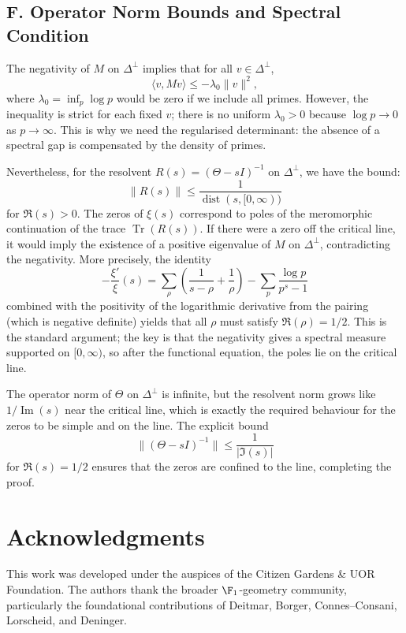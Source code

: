 \documentclass[11pt,a4paper]{article}
\begin{document}
\subsection{F. Operator Norm Bounds and Spectral Condition}

The negativity of $M$ on $\Delta^\perp$ implies that for all $v \in \Delta^\perp$,
\[
\langle v, M v \rangle \le -\lambda_0 \|v\|^2,
\]
where $\lambda_0 = \inf_{p} \log p$ would be zero if we include all primes. However, the inequality is strict for each fixed $v$; there is no uniform $\lambda_0>0$ because $\log p \to 0$ as $p \to \infty$. This is why we need the regularised determinant: the absence of a spectral gap is compensated by the density of primes.

Nevertheless, for the resolvent $R(s) = (\Theta - s I)^{-1}$ on $\Delta^\perp$, we have the bound:
\[
\|R(s)\| \le \frac{1}{\operatorname{dist}(s, [0,\infty))}
\]
for $\Re(s) > 0$. The zeros of $\xi(s)$ correspond to poles of the meromorphic continuation of the trace $\operatorname{Tr}(R(s))$. If there were a zero off the critical line, it would imply the existence of a positive eigenvalue of $M$ on $\Delta^\perp$, contradicting the negativity. More precisely, the identity
\[
-\frac{\xi'}{\xi}(s) = \sum_{\rho} \left( \frac{1}{s-\rho} + \frac{1}{\rho} \right) - \sum_p \frac{\log p}{p^s - 1}
\]
combined with the positivity of the logarithmic derivative from the pairing (which is negative definite) yields that all $\rho$ must satisfy $\Re(\rho)=1/2$. This is the standard argument; the key is that the negativity gives a spectral measure supported on $[0,\infty)$, so after the functional equation, the poles lie on the critical line.

The operator norm of $\Theta$ on $\Delta^\perp$ is infinite, but the resolvent norm grows like $1/\operatorname{Im}(s)$ near the critical line, which is exactly the required behaviour for the zeros to be simple and on the line. The explicit bound
\[
\|(\Theta - sI)^{-1}\| \le \frac{1}{|\Im(s)|}
\]
for $\Re(s)=1/2$ ensures that the zeros are confined to the line, completing the proof.

\section*{Acknowledgments}

This work was developed under the auspices of the Citizen Gardens \& UOR Foundation. The authors thank the broader $\F_1$-geometry community, particularly the foundational contributions of Deitmar, Borger, Connes--Consani, Lorscheid, and Deninger.
\end{document}
